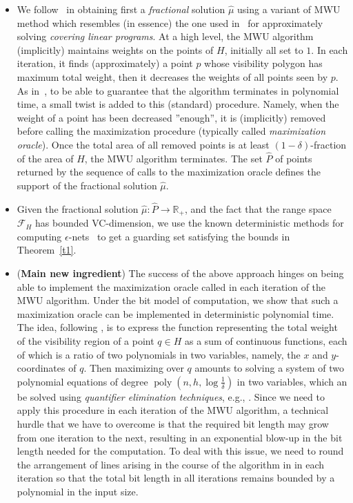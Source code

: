 \documentclass[a4paper,11pt]{article}
\def\RR{\mathbb R}
\def\cF{\mathcal F}
\newcommand{\poly}{\operatorname{poly}}
\begin{document}
\begin{itemize}
	
	\item We follow~\cite{ERS05,PA95} in obtaining first a {\it fractional} solution $\widehat \mu$ using a variant of MWU method which resembles (in essence) the one used in~\cite{GK07} for approximately solving {\it covering linear programs}. At a high level, the MWU algorithm (implicitly) maintains weights on the points of $H$, initially all set to $1$. In each iteration, it finds (approximately) a point $p$ whose visibility polygon has maximum total weight, then it decreases the weights of all points seen by $p$. As in~\cite{GK07}, to be able to guarantee that the algorithm terminates in polynomial time, a small twist is added to this (standard) procedure. Namely, when the weight of a point has been decreased ''enough'', it is (implicitly) removed before  calling the maximization procedure (typically called {\it maximization oracle}). Once the total area of all removed points is at least $(1-\delta)$-fraction of the area of $H$, the MWU algorithm terminates. The set $\widehat P$ of points returned by the sequence of calls to the maximization oracle defines the support of the fractional solution $\widehat\mu$. 
	
	\item Given the fractional solution $\widehat\mu:\widehat P\to\RR_+$, and the fact that the range space $\cF_H$ has bounded VC-dimension, we use the known deterministic methods for computing $\epsilon$-nets~\cite{BCM99,CM96,M91} to get a guarding set satisfying the bounds in Theorem~\ref{t1}.
	
	\item ({\bf Main new ingredient}) The success of the above approach hinges on being able to implement the maximization oracle called in each iteration of the MWU algorithm. Under the bit model of computation, we show that such a maximization oracle can be implemented in deterministic polynomial time. The idea, following \cite{NT94}, is to express the function representing the total weight of the visibility region of a point $q\in H$ as a sum of continuous functions, each of which is a ratio of two polynomials in two variables, namely, the $x$ and $y$-coordinates of $q$. Then maximizing over $q$ amounts to solving a system of two polynomial equations of degree $\poly(n,h,\log\frac{1}{\delta})$ in two variables, which an be solved using {\em quantifier elimination techniques}, e.g., \cite{BPR96,GV88,R92}. Since we need to apply this procedure in each iteration of the MWU algorithm, a technical hurdle that we have to overcome is that the required bit length may grow from one iteration to the next, resulting in an exponential blow-up in the bit length needed for the computation.  To deal with this issue, we need to round the arrangement of lines arising in the course of the algorithm in in each iteration so that the total bit length in all iterations remains bounded by a polynomial in the input size.  
    
\end{itemize}
\end{document}
